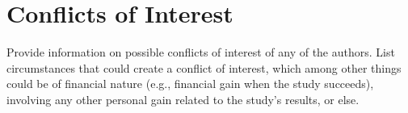 \section*{Conflicts of Interest}

\begin{prereg}
\begin{instruction}
Provide information on possible conflicts of interest of any of the authors. List circumstances that could create a conflict of interest, which among other things could be of financial nature (e.g., financial gain when the study succeeds), involving any other personal gain related to the study’s results, or else.
\end{instruction}
\end{prereg}


